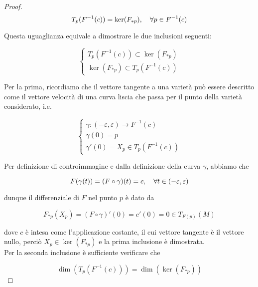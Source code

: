 \begin{proof}
	\begin{equation}
		T_{p}(F^{-1}(c)) = \ker(F_{*p}) \qcomma \forall p \in F^{-1}(c)
	\end{equation} 
	
	Questa uguaglianza equivale a dimostrare le due inclusioni seguenti:
	
	\begin{equation}
		\begin{cases}
			T_{p}(F^{-1}(c)) \subset \ker(F_{*p})\\
			\ker(F_{*p}) \subset T_{p}(F^{-1}(c))
		\end{cases}
	\end{equation}
	
	Per la prima, ricordiamo che il vettore tangente a una varietà può essere descritto come il vettore velocità di una curva liscia che passa per il punto della varietà considerato, i.e.
	
	\begin{equation}
		\begin{cases}
			\gamma : (-\varepsilon,\varepsilon) \to F^{-1}(c)\\
			\gamma(0) = p\\
			\gamma'(0) = X_{p} \in T_{p}(F^{-1}(c))
		\end{cases}
	\end{equation}

	Per definizione di controimmagine e dalla definizione della curva $ \gamma $, abbiamo che
	
	\begin{equation}
		F(\gamma(t)) = (F \circ \gamma)(t) = c \qcomma \forall t \in (-\varepsilon,\varepsilon)
	\end{equation}
	
	dunque il differenziale di $ F $ nel punto $ p $ è dato da
	
	\begin{equation}
		F_{*p}(X_{p}) = (F \circ \gamma)'(0) %
		= c'(0) %
		= 0 \in T_{F(p)}(M)
	\end{equation}

	dove $ c $ è intesa come l'applicazione costante, il cui vettore tangente è il vettore nullo, perciò $ X_{p} \in \ker(F_{*p}) $ e la prima inclusione è dimostrata.\\
	Per la seconda inclusione è sufficiente verificare che
	
	\begin{equation}
		\dim(T_{p}(F^{-1}(c))) = \dim(\ker(F_{*p}))
	\end{equation}


\end{proof}
